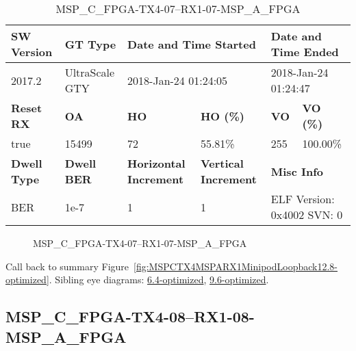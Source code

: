 \begin{table}[h]
\centering
\caption{MSP\_C\_FPGA-TX4-07--RX1-07-MSP\_A\_FPGA}
\label{tab:MSPCFPGATX407RX107MSPAFPGA12.8-optimized}
\begin{tabular}{@{}|l|l|l|l|l|l|@{}}
\toprule
\textbf{SW Version}                & \textbf{GT Type}   & \multicolumn{2}{l|}{\textbf{Date and Time Started}}            & \multicolumn{2}{l|}{\textbf{Date and Time Ended}}        \\ \midrule
2017.2                       & UltraScale GTY          & \multicolumn{2}{l|}{2018-Jan-24 01:24:05}                   & \multicolumn{2}{l|}{2018-Jan-24 01:24:47}               \\ \midrule
\textbf{Reset RX}                  & \textbf{OA} & \textbf{HO}   & \textbf{HO (\%)} & \textbf{VO} & \textbf{VO (\%)} \\ \midrule
true & 15499        & 72          & 55.81\%        & 255        & 100.00\%       \\ \midrule
\textbf{Dwell Type}                & \textbf{Dwell BER} & \textbf{Horizontal Increment} & \textbf{Vertical Increment}    & \multicolumn{2}{l|}{\textbf{Misc Info}}                  \\ \midrule
BER                            & 1e-7        & 1        & 1           & \multicolumn{2}{l|}{ELF Version: 0x4002 SVN: 0}                         \\ \bottomrule
\end{tabular}
\end{table}

\begin{figure}[h]
\caption{MSP\_C\_FPGA-TX4-07--RX1-07-MSP\_A\_FPGA} \label{fig:MSPCFPGATX407RX107MSPAFPGA12.8-optimized}
\end{figure}

Call back to summary Figure~\ref{fig:MSPCTX4MSPARX1MinipodLoopback12.8-optimized}.
Sibling eye diagrams: \hyperref[sec:MSPCFPGATX407RX107MSPAFPGA6.4-optimized]{6.4-optimized}, \hyperref[sec:MSPCFPGATX407RX107MSPAFPGA9.6-optimized]{9.6-optimized}.

\clearpage
\newpage


\subsection{MSP\_C\_FPGA-TX4-08--RX1-08-MSP\_A\_FPGA}\label{sec:MSPCFPGATX408RX108MSPAFPGA12.8-optimized}

